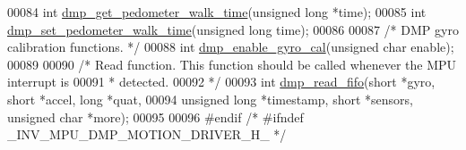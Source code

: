 \begin{DoxyCode}
00084 \textcolor{keywordtype}{int} \hyperlink{group___d_r_i_v_e_r_s_ga62c8e5e99986b0e60ca0dc9a9b9c3fcc}{dmp\_get\_pedometer\_walk\_time}(\textcolor{keywordtype}{unsigned} \textcolor{keywordtype}{long} *time);
00085 \textcolor{keywordtype}{int} \hyperlink{group___d_r_i_v_e_r_s_ga62f469269047f8cba16a2b7f5349acc0}{dmp\_set\_pedometer\_walk\_time}(\textcolor{keywordtype}{unsigned} \textcolor{keywordtype}{long} time);
00086 
00087 \textcolor{comment}{/* DMP gyro calibration functions. */}
00088 \textcolor{keywordtype}{int} \hyperlink{group___d_r_i_v_e_r_s_ga653ebcec6758f006dd89939e8f3c6ebb}{dmp\_enable\_gyro\_cal}(\textcolor{keywordtype}{unsigned} \textcolor{keywordtype}{char} enable);
00089 
00090 \textcolor{comment}{/* Read function. This function should be called whenever the MPU interrupt is}
00091 \textcolor{comment}{ * detected.}
00092 \textcolor{comment}{ */}
00093 \textcolor{keywordtype}{int} \hyperlink{group___d_r_i_v_e_r_s_ga02db5f25359abe84be002c543cdc3803}{dmp\_read\_fifo}(\textcolor{keywordtype}{short} *gyro, \textcolor{keywordtype}{short} *accel, \textcolor{keywordtype}{long} *quat,
00094     \textcolor{keywordtype}{unsigned} \textcolor{keywordtype}{long} *timestamp, \textcolor{keywordtype}{short} *sensors, \textcolor{keywordtype}{unsigned} \textcolor{keywordtype}{char} *more);
00095 
00096 \textcolor{preprocessor}{#endif  }\textcolor{comment}{/* #ifndef \_INV\_MPU\_DMP\_MOTION\_DRIVER\_H\_ */}\textcolor{preprocessor}{}
\end{DoxyCode}
